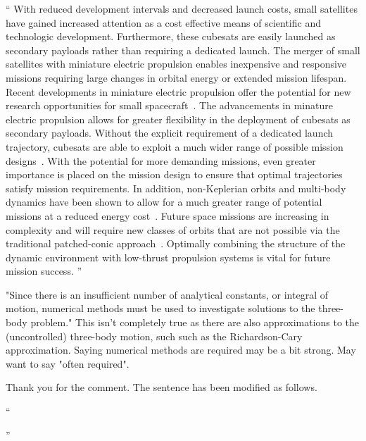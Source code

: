 \documentclass[11pt]{article}
\newenvironment{correction}{\begin{list}{}{\setlength{\leftmargin}{1cm}\setlength{\rightmargin}{1cm}}\vspace{\parsep}\item[]``}{''\end{list}}
\begin{document}
\begin{enumerate}
\begin{correction}
            With reduced development intervals and decreased launch costs, small satellites have gained increased attention as a cost effective means of scientific and technologic development. 
            Furthermore, these cubesats are easily launched as secondary payloads rather than requiring a dedicated launch.
            The merger of small satellites with miniature electric propulsion enables inexpensive and responsive missions requiring large changes in orbital energy or extended mission lifespan.
            Recent developments in miniature electric propulsion offer the potential for new research opportunities for small spacecraft~\cite{haque2013}.
            The advancements in minature electric propulsion allows for greater flexibility in the deployment of cubesats as secondary payloads.
            Without the explicit requirement of a dedicated launch trajectory, cubesats are able to exploit a much wider range of possible mission designs~\cite{folta2015}.
            With the potential for more demanding missions, even greater importance is placed on the mission design to ensure that optimal trajectories satisfy mission requirements. 
            In addition, non-Keplerian orbits and multi-body dynamics have been shown to allow for a much greater range of potential missions at a reduced energy cost~\cite{folta2015,koon2011}.
            Future space missions are increasing in complexity and will require new classes of orbits that are not possible via the traditional patched-conic approach~\cite{ross2006,gomez2001}.
            Optimally combining the structure of the dynamic environment with low-thrust propulsion systems is vital for future mission success.
        \end{correction}

\item 
    \begin{itshape}
"Since there is an insufficient number of analytical constants, or integral of motion, numerical methods must be used to investigate solutions to the three-body problem."  This isn't completely true as there are also approximations to the (uncontrolled) three-body motion, such such as the Richardson-Cary approximation.  Saying numerical methods are required may be a bit strong.  May want to say "often required".
\end{itshape}

Thank you for the comment.
The sentence has been modified as follows.

\begin{correction}


\end{correction}
\end{enumerate}
\end{document}
